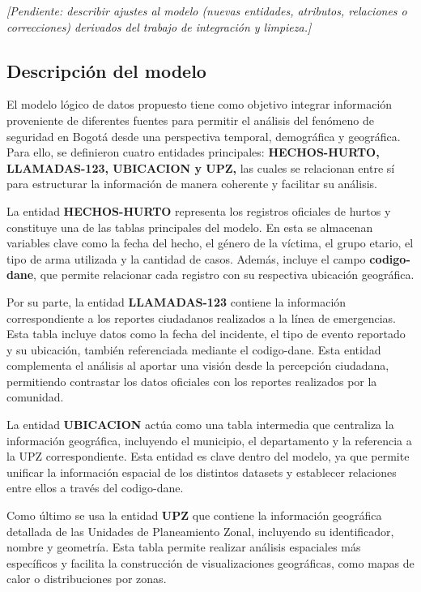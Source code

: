 \documentclass[12pt,letterpaper]{article}
\begin{document}
\textit{[Pendiente: describir ajustes al modelo (nuevas entidades, atributos, relaciones o correcciones) derivados del trabajo de integración y limpieza.]}

\subsection{Descripción del modelo}

El modelo lógico de datos propuesto tiene como objetivo integrar información proveniente de diferentes fuentes para permitir el análisis del fenómeno de seguridad en Bogotá desde una perspectiva temporal, demográfica y geográfica. Para ello, se definieron cuatro entidades principales: \textbf{HECHOS-HURTO, LLAMADAS-123, UBICACION y UPZ,} las cuales se relacionan entre sí para estructurar la información de manera coherente y facilitar su análisis.

La entidad \textbf{HECHOS-HURTO} representa los registros oficiales de hurtos y constituye una de las tablas principales del modelo. En esta se almacenan variables clave como la fecha del hecho, el género de la víctima, el grupo etario, el tipo de arma utilizada y la cantidad de casos. Además, incluye el campo \textbf{codigo-dane}, que permite relacionar cada registro con su respectiva ubicación geográfica.

Por su parte, la entidad \textbf{LLAMADAS-123} contiene la información correspondiente a los reportes ciudadanos realizados a la línea de emergencias. Esta tabla incluye datos como la fecha del incidente, el tipo de evento reportado y su ubicación, también referenciada mediante el codigo-dane. Esta entidad complementa el análisis al aportar una visión desde la percepción ciudadana, permitiendo contrastar los datos oficiales con los reportes realizados por la comunidad.

La entidad \textbf{UBICACION} actúa como una tabla intermedia que centraliza la información geográfica, incluyendo el municipio, el departamento y la referencia a la UPZ correspondiente. Esta entidad es clave dentro del modelo, ya que permite unificar la información espacial de los distintos datasets y establecer relaciones entre ellos a través del codigo-dane.

Como último se usa la entidad \textbf{UPZ} que contiene la información geográfica detallada de las Unidades de Planeamiento Zonal, incluyendo su identificador, nombre y geometría. Esta tabla permite realizar análisis espaciales más específicos y facilita la construcción de visualizaciones geográficas, como mapas de calor o distribuciones por zonas.
\end{document}
